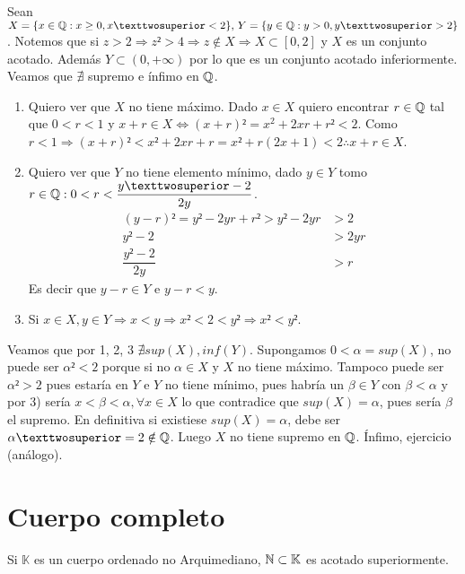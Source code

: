 \begin{eg}
    Sean \(X = \{ x \in \Q : x \geq 0, x² < 2 \}\text{, } Y = \{ y \in \Q : y>0, y² > 2 \}\). Notemos que si \(z>2 \Rightarrow z² > 4 \Rightarrow z \notin X \Rightarrow X \subset [0, 2]\) y \(X\) es un conjunto acotado. Además \(Y \subset (0, +\infty)\) por lo que es un conjunto acotado inferiormente. Veamos que \(\nexists\) supremo e ínfimo en \(\mathbb{Q}\). \begin{enumerate}
        \item Quiero ver que \(X\) no tiene máximo. Dado \(x \in X\) quiero encontrar \(r \in \mathbb{Q}\) tal que \(0<r<1\) y \(x+r \in X \iff (x+r)² =x^2+2xr+r² < 2\). Como \(r<1 \Rightarrow (x+r)²<x²+2xr+r=x²+r(2x+1)<2 \therefore x+r \in X\).
        \item Quiero ver que \(Y\) no tiene elemento mínimo, dado \(y \in Y\) tomo \(r \in \Q : 0 < r < \dfrac{y²-2}{2y}\).
              \begin{align*}
                  (y - r)²          = y² - 2yr + r² > y² - 2yr & > 2   \\
                  y² - 2                                       & > 2yr \\
                  \dfrac{y²-2}{2y}                             & > r
              \end{align*}
              Es decir que \(y-r \in Y\) e \(y-r < y\).
        \item Si \(x \in X, y \in Y \Rightarrow x < y \Rightarrow x² < 2 < y² \Rightarrow x² < y²\).
    \end{enumerate}

    Veamos que por 1, 2, 3 \(\nexists sup(X), inf(Y)\). Supongamos \(0< \alpha = sup(X)\), no puede ser \(\alpha²<2\) porque si no \(\alpha \in X\) y \(X\) no tiene máximo. Tampoco puede ser \(\alpha² > 2\) pues estaría en \(Y\) e \(Y\) no tiene mínimo, pues habría un \(\beta \in Y\) con \(\beta < \alpha\) y por 3) sería \(x < \beta < \alpha, \forall x \in X\) lo que contradice que \(sup(X) = \alpha\), pues sería \(\beta\) el supremo.
    En definitiva si existiese \(sup(X) = \alpha\), debe ser \(\alpha² = 2 \notin \Q\). Luego \(X\) no tiene supremo en \(\mathbb{Q}\).
    Ínfimo, ejercicio (análogo).
\end{eg}

\section{Cuerpo completo}

\begin{definition}
    Si \(\mathbb{K}\) es un cuerpo ordenado no Arquimediano, \(\mathbb{N} \subset \mathbb{K}\) es acotado superiormente.
\end{definition}


